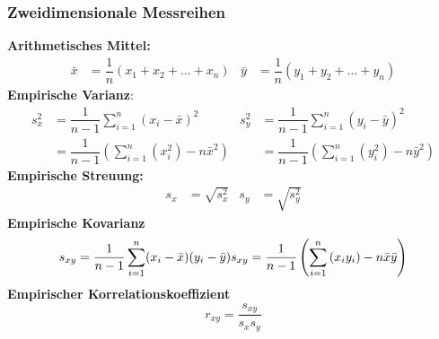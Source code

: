 \documentclass[
	ngerman,
	accentcolor=9c,%
	type=intern,
	marginpar=false
	]{tudapub}
\begin{document}
            \subsubsection{Zweidimensionale Messreihen}
                \textbf{Arithmetisches Mittel:}
                \begin{align*}
                    \bar{x}&=\dfrac{1}{n}(x_1+x_2+\dots+x_n) & \bar{y}&=\dfrac{1}{n}(y_1+y_2+\dots+y_n)
                \end{align*}
                \textbf{Empirische Varianz}:
                \begin{align*}
                    s_x^2 &= \dfrac{1}{n-1}\sum_{i=1}^n (x_i - \bar{x})^2 & s_y^2 &= \dfrac{1}{n-1}\sum_{i=1}^n (y_i - \bar{y})^2\\
                     &= \dfrac{1}{n-1} \left( \sum_{i=1}^n \left(x_i^2\right) - n\bar{x}^2 \right) & &= \dfrac{1}{n-1} \left( \sum_{i=1}^n \left(y_i^2\right) - n\bar{y}^2 \right)
                \end{align*}
                \textbf{Empirische Streuung:}
                \begin{align*}
                    s_x &= \sqrt{s^2_x} & s_y &= \sqrt{s^2_y}
                \end{align*}
                \textbf{Empirische Kovarianz}
                \begin{equation*}
                    s_{xy}= \dfrac{1}{n-1}\sum_{i=1}^n (x_i - \bar{x})(y_i - \bar{y})\\
                    s_{xy}= \dfrac{1}{n-1} \left( \sum_{i=1}^n \left(x_i y_i\right) - n \bar{x} \bar{y} \right)
                \end{equation*}
                \textbf{Empirischer Korrelationskoeffizient}
                \begin{equation*}
                    r_{xy} = \dfrac{s_{xy}}{s_x s_y}
                \end{equation*}
\end{document}
